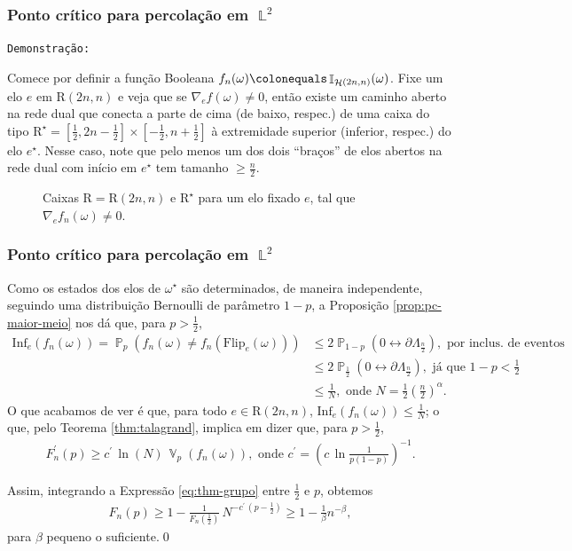 \documentclass[9pt]{beamer}
\theoremstyle{definition} %
\DeclareMathOperator{\PX}{\mathbb{P}} %
\DeclareMathOperator{\VX}{\mathbb{V}} %
\DeclareMathOperator{\IX}{\mathbb{I}} %
\DeclareMathOperator{\LX}{\mathbb{L}} %
\DeclareMathOperator{\HL}{\mathcal{H}} %
\newcommand{\diffe}{{\nabla_e}f(\omega)}
\newcommand{\flipe}{\text{Flip}_e(\omega)}
\begin{document}
	\begin{frame}[t]
		\frametitle{Ponto crítico para percolação em $\LX^2$}
		\texttt{Demonstração:}
		
		Comece por definir a função Booleana $f_n(\omega) \colonequals \IX_{\HL(2n, n)}(\omega)$. Fixe um elo $e$ em $\text{R}(2n, n)$ e veja que se $\diffe \neq 0$, então existe um caminho aberto na rede dual que conecta a parte de cima (de baixo, respec.) de uma caixa do tipo $\text{R}^{\star} = \left[\frac{1}{2}, 2n - \frac{1}{2}\right] \times [-\frac{1}{2}, n + \frac{1}{2}]$ à extremidade superior (inferior, respec.) do elo $e^{\star}$. Nesse caso, note que pelo menos um dos dois ``braços'' de elos abertos na rede dual com início em $e^{\star}$ tem tamanho $ \geq \frac{n}{2}$.
		\vspace{-12pt}
		\begin{figure}
			
			\vspace{-9pt}
			\caption{\justifying Caixas $\text{R} = \text{R}(2n, n)$ e $\text{R}^{\star}$ para um elo fixado $e$, tal que $\nabla_e f_n(\omega) \neq 0$.}
			\label{fig:caixa-2n}
		\end{figure}
		
	\end{frame}

	\begin{frame}[t]
		\frametitle{Ponto crítico para percolação em $\LX^2$}
		Como os estados dos elos de $\omega^{\star}$ são determinados, de maneira independente, seguindo uma distribuição Bernoulli de parâmetro $1 - p$, a Proposição \ref{prop:pc-maior-meio} nos dá que, para $p > \frac{1}{2}$, 
		\begin{align*}
		\text{Inf}_e(f_n(\omega)) = \PX_p(f_n(\omega) \neq f_n(\flipe)) &\leq 2\PX_{1-p}\left(0 \leftrightarrow \partial\Lambda_{\frac{n}{2}}\right), \text{ por inclus. de eventos} \\
		&\leq 2\PX_{\frac{1}{2}}\left(0 \leftrightarrow \partial\Lambda_{\frac{n}{2}}\right), \text{ já que $1 - p < \frac{1}{2}$} \\
		&\leq \frac{1}{N}, \text{ onde $N = \frac{1}{2}\left(\frac{n}{2}\right)^{\alpha}$}.
		\end{align*}\pause
		O que acabamos de ver é que, para todo $e \in \text{R}(2n ,n)$, $\text{Inf}_e(f_n(\omega)) \leq \frac{1}{N}$; o que, pelo Teorema \ref{thm:talagrand}, implica em dizer que, para $p > \frac{1}{2}$,
		\begin{align}\label{eq:thm-grupo}
		F_n^{\prime}(p) \geq c^{\prime}\,\ln(N)\,\VX_p(f_n(\omega)), \text{ onde } c^{\prime} = \left(c\,\ln\frac{1}{p(1-p)}\right)^{-1}.
		\end{align}
		
		Assim, integrando a Expressão \ref{eq:thm-grupo} entre $\frac{1}{2}$ e $p$, obtemos
		\begin{align*}
		F_n(p) \geq 1 - \frac{1}{F_n\left(\frac{1}{2}\right)} \, N^{-c^{\prime}\,\left(p - \frac{1}{2}\right)} \geq 1 - \frac{1}{\beta} n^{-\beta},
		\end{align*}
		para $\beta$ pequeno o suficiente.\hspace{\fill}\qed
	\end{frame}
\end{document}
